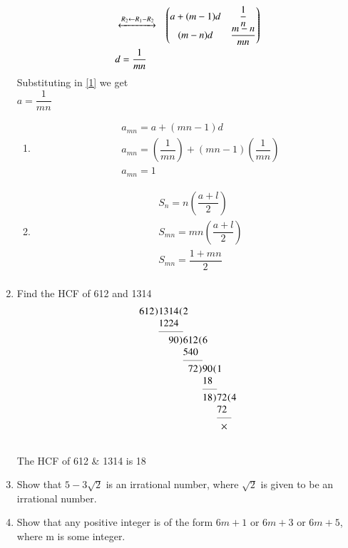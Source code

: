 \documentclass[journal,12pt,twocolumn]{IEEEtran}
\newcommand\ml[1]{\multicolumn{1}{l}{#1}}
\newcommand\lparen{\mkern1mu(\mkern1mu}
\newcommand\rparen{\mkern1mu)\mkern1mu}
\newcommand\pp{\phantom{\lparen}}
\renewcommand\thesection{\arabic{section}}
\begin{document}
\begin{enumerate}[label=\thesection.\arabic*.,ref=\thesection.\theenumi]
\begin{align}
 &\xleftrightarrow[]{ R_2 \leftarrow R_1 - R_2}
 &\myvec{a+(m-1)d&\dfrac{1}{n} \\ (m-n)d&\dfrac{m-n}{mn}}& \\
 &d = \dfrac{1}{mn} \nonumber
 \medskip \nonumber 
\end{align}
 Substituting in \eqref{1} we get \\ 
 $a = \dfrac{1}{mn}$\\
\begin{enumerate}
\item
 \begin{align}
 & a_{mn} = a+(mn-1)d \nonumber \\
 & a_{mn} = (\dfrac{1}{mn})+(mn-1)(\dfrac{1}{mn}) \nonumber \\
 & a_{mn} = 1 \nonumber
 \end{align}
\item
 \begin{align}
 & S_{n} =  n(\dfrac{a+l}{2})\nonumber \\
 & S_{mn} =  mn(\dfrac{a+l}{2})\nonumber \\
 & S_{mn} =  \dfrac{1+mn}{2}\nonumber\\
 \nonumber
 \end{align}
\end{enumerate}

\item Find the HCF of 612 and 1314 \\
\solution 
\[
\setlength\arraycolsep{0pt}
\begin{array}{ *{11}{r} }
   612 & \rparen & 1314 & \lparen & \ml{2} \\
   &&        1224 & \pp \\
\cmidrule{3-4}
   && 90 & \rparen & 612 & \lparen & \ml{6} \\
   &&&& 540 & \pp \\
\cmidrule{5-6}
   &&&& 72 & \rparen & 90 & \lparen & \ml{1} \\
   &&&&&& 18 & \pp \\
\cmidrule{7-8}
   &&&&&& 18 & \rparen & 72 & \lparen & \ml{4} \\
   &&&&&&&& 72 & \pp\\
\cmidrule{9-10}
   &&&&&&&& \multicolumn{2}{c}{\times}
\end{array}
\] \\
The HCF of 612 \& 1314 is 18 
\item Show that $5 - 3\sqrt{2}$ is an irrational number, where $\sqrt{2}$ is given to be an irrational number.\\
\item Show that any positive integer is of the form $6m+1$ or $6m+3$ or $6m+5$, where m is some integer.
\end{enumerate}
\end{document}
